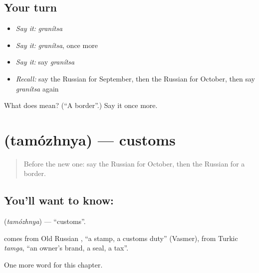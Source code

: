 \subsection*{Your turn}
\begin{itemize}
\raggedright
  \item \emph{Say it:} \emph{granítsa}
  \item \emph{Say it:} \emph{granítsa}, once more
  \item \emph{Say it:} say \emph{granítsa}
  \item \emph{Recall:} say the Russian for September, then the Russian for October, then say \emph{granítsa} again
\end{itemize}

\begin{tcolorbox}[breakable,colback=teal!4,colframe=teal!35!black,title={Before you move on}]
What does  mean? (\textquotedblleft{}A border\textquotedblright{}.) Say it once more.
\end{tcolorbox}
\section[\texorpdfstring{\ru{таможня} (tamózhnya)}{таможня (tamózhnya)}]{ (tamózhnya) — customs}

\label{lesson:RU-C213-tamozhnya}



\begin{quote}
Before the new one: say the Russian for October, then the Russian for a border.
\end{quote}

\subsection*{You'll want to know: }
\textbf{} (\emph{tamózhnya}) — \textquotedblleft{}customs\textquotedblright{}.

\begin{cousinweb}
\textbf{} comes from Old Russian \emph{}, \textquotedblleft{}a stamp, a customs duty\textquotedblright{} (Vasmer), from Turkic \emph{tamga}, \textquotedblleft{}an owner's brand, a seal, a tax\textquotedblright{}.
\end{cousinweb}

\begin{grammarlens}[title={What you've built}]
One more word for this chapter.
\end{grammarlens}

